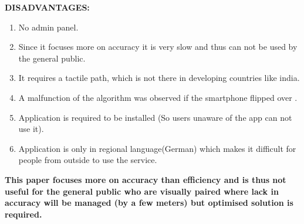 \documentclass[a4paper, 12pt]{article}
\begin{document}
\textbf{DISADVANTAGES:}
\begin{enumerate}
	\item No admin panel.
	\item Since it focuses more on accuracy it is very slow and thus can not be used by the general public.
	\item It requires a tactile path, which is not there in developing countries like india.
	\item A malfunction of the algorithm was observed if the smartphone ﬂipped over .
	\item Application is required to be installed (So users unaware of the app can not use it).
	\item  Application is only in regional language(German) which makes it difficult for people from outside to use the service.	
\end{enumerate}
\textbf{This paper focuses more on accuracy than efficiency and is thus not useful for the general public who are visually paired where lack in accuracy will be  managed (by a few meters) but optimised solution is required.}
\end{document}
